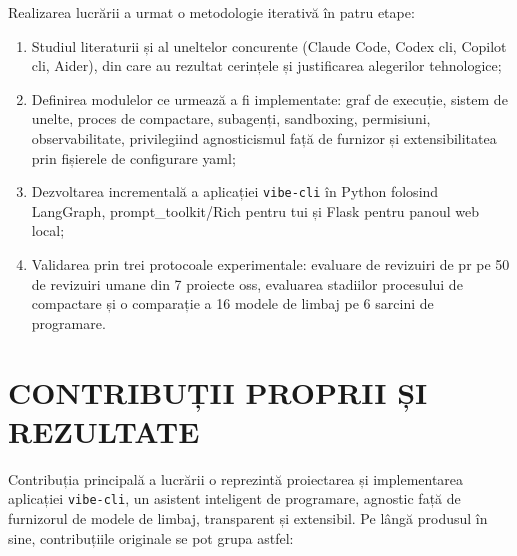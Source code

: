 \documentclass[12pt, a4paper, oneside, romanian]{teza-upb}
\begin{document}
  Realizarea lucrării a urmat o metodologie iterativă în patru etape: 
  \begin{enumerate}
  \item Studiul literaturii și al uneltelor concurente (Claude Code, Codex \ac{cli}, Copilot \ac{cli}, Aider), din care au rezultat cerințele și justificarea alegerilor tehnologice;
  \item Definirea modulelor ce urmează a fi implementate: graf de execuție, sistem de unelte, proces de compactare, subagenți, sandboxing, permisiuni, observabilitate, privilegiind agnosticismul față de furnizor și extensibilitatea prin fișierele de configurare \ac{yaml};
  \item Dezvoltarea incrementală a aplicației \texttt{vibe-cli} în Python folosind LangGraph, \newline prompt\_toolkit/Rich pentru \ac{tui} și Flask pentru panoul web local; 
  \item Validarea prin trei protocoale experimentale: evaluare de revizuiri de \ac{pr} pe 50 de revizuiri umane din 7 proiecte \ac{oss}, evaluarea stadiilor procesului de compactare și o comparație a 16 modele de limbaj pe 6 sarcini de programare.
  \end{enumerate}


\section*{CONTRIBUȚII PROPRII ȘI REZULTATE}

  Contribuția principală a lucrării o reprezintă proiectarea și implementarea aplicației \texttt{vibe-cli}, un asistent
  inteligent de programare, agnostic față de furnizorul de modele de limbaj, transparent și extensibil.
  Pe lângă produsul în sine, contribuțiile originale se pot grupa astfel:
\end{document}

